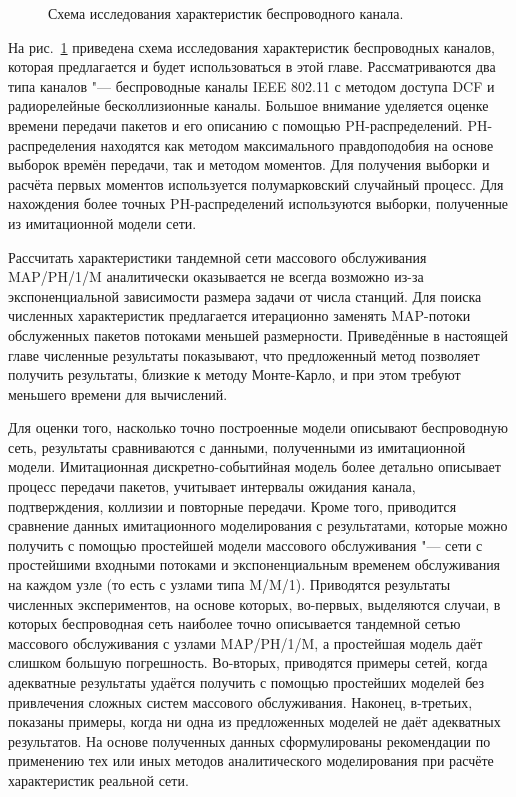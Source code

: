 \begin{figure}[h]
  \caption{Схема исследования характеристик беспроводного канала.}
  \label{fig:ch4_research_schema}
\end{figure}

На рис.~\ref{fig:ch4_research_schema} приведена схема исследования характеристик беспроводных каналов, которая предлагается и будет использоваться в этой главе. Рассматриваются два типа каналов "--- беспроводные каналы IEEE 802.11 с методом доступа DCF и радиорелейные бесколлизионные каналы. Большое внимание уделяется оценке времени передачи пакетов и его описанию с помощью PH-распределений. PH-распределения находятся как методом максимального правдоподобия на основе выборок времён передачи, так и методом моментов. Для получения выборки и расчёта первых моментов используется полумарковский случайный процесс. Для нахождения более точных PH-распределений используются выборки, полученные из имитационной модели сети.

Рассчитать характеристики тандемной сети массового обслуживания MAP/PH/1/M аналитически оказывается не всегда возможно из-за экспоненциальной зависимости размера задачи от числа станций. Для поиска численных характеристик предлагается итерационно заменять MAP-потоки обслуженных пакетов потоками меньшей размерности. Приведённые в настоящей главе численные результаты показывают, что предложенный метод позволяет получить результаты, близкие к методу Монте-Карло, и при этом требуют меньшего времени для вычислений.

Для оценки того, насколько точно построенные модели описывают беспроводную сеть, результаты сравниваются с данными, полученными из имитационной модели. Имитационная дискретно-событийная модель более детально описывает процесс передачи пакетов, учитывает интервалы ожидания канала, подтверждения, коллизии и повторные передачи. Кроме того, приводится сравнение данных имитационного моделирования с результатами, которые можно получить с помощью простейшей модели массового обслуживания "--- сети с простейшими входными потоками и экспоненциальным временем обслуживания на каждом узле (то есть с узлами типа M/M/1). Приводятся результаты численных экспериментов, на основе которых, во-первых, выделяются случаи, в которых беспроводная сеть наиболее точно описывается тандемной сетью массового обслуживания с узлами MAP/PH/1/M, а простейшая модель даёт слишком большую погрешность. Во-вторых, приводятся примеры сетей, когда адекватные результаты удаётся получить с помощью простейших моделей без привлечения сложных систем массового обслуживания. Наконец, в-третьих, показаны примеры, когда ни одна из предложенных моделей не даёт адекватных результатов. На основе полученных данных сформулированы рекомендации по применению тех или иных методов аналитического моделирования при расчёте характеристик реальной сети.

